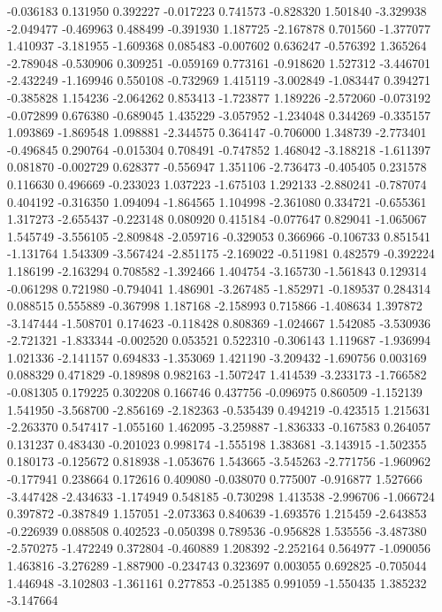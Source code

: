 -0.036183
0.131950
0.392227
-0.017223
0.741573
-0.828320
1.501840
-3.329938
-2.049477
-0.469963
0.488499
-0.391930
1.187725
-2.167878
0.701560
-1.377077
1.410937
-3.181955
-1.609368
0.085483
-0.007602
0.636247
-0.576392
1.365264
-2.789048
-0.530906
0.309251
-0.059169
0.773161
-0.918620
1.527312
-3.446701
-2.432249
-1.169946
0.550108
-0.732969
1.415119
-3.002849
-1.083447
0.394271
-0.385828
1.154236
-2.064262
0.853413
-1.723877
1.189226
-2.572060
-0.073192
-0.072899
0.676380
-0.689045
1.435229
-3.057952
-1.234048
0.344269
-0.335157
1.093869
-1.869548
1.098881
-2.344575
0.364147
-0.706000
1.348739
-2.773401
-0.496845
0.290764
-0.015304
0.708491
-0.747852
1.468042
-3.188218
-1.611397
0.081870
-0.002729
0.628377
-0.556947
1.351106
-2.736473
-0.405405
0.231578
0.116630
0.496669
-0.233023
1.037223
-1.675103
1.292133
-2.880241
-0.787074
0.404192
-0.316350
1.094094
-1.864565
1.104998
-2.361080
0.334721
-0.655361
1.317273
-2.655437
-0.223148
0.080920
0.415184
-0.077647
0.829041
-1.065067
1.545749
-3.556105
-2.809848
-2.059716
-0.329053
0.366966
-0.106733
0.851541
-1.131764
1.543309
-3.567424
-2.851175
-2.169022
-0.511981
0.482579
-0.392224
1.186199
-2.163294
0.708582
-1.392466
1.404754
-3.165730
-1.561843
0.129314
-0.061298
0.721980
-0.794041
1.486901
-3.267485
-1.852971
-0.189537
0.284314
0.088515
0.555889
-0.367998
1.187168
-2.158993
0.715866
-1.408634
1.397872
-3.147444
-1.508701
0.174623
-0.118428
0.808369
-1.024667
1.542085
-3.530936
-2.721321
-1.833344
-0.002520
0.053521
0.522310
-0.306143
1.119687
-1.936994
1.021336
-2.141157
0.694833
-1.353069
1.421190
-3.209432
-1.690756
0.003169
0.088329
0.471829
-0.189898
0.982163
-1.507247
1.414539
-3.233173
-1.766582
-0.081305
0.179225
0.302208
0.166746
0.437756
-0.096975
0.860509
-1.152139
1.541950
-3.568700
-2.856169
-2.182363
-0.535439
0.494219
-0.423515
1.215631
-2.263370
0.547417
-1.055160
1.462095
-3.259887
-1.836333
-0.167583
0.264057
0.131237
0.483430
-0.201023
0.998174
-1.555198
1.383681
-3.143915
-1.502355
0.180173
-0.125672
0.818938
-1.053676
1.543665
-3.545263
-2.771756
-1.960962
-0.177941
0.238664
0.172616
0.409080
-0.038070
0.775007
-0.916877
1.527666
-3.447428
-2.434633
-1.174949
0.548185
-0.730298
1.413538
-2.996706
-1.066724
0.397872
-0.387849
1.157051
-2.073363
0.840639
-1.693576
1.215459
-2.643853
-0.226939
0.088508
0.402523
-0.050398
0.789536
-0.956828
1.535556
-3.487380
-2.570275
-1.472249
0.372804
-0.460889
1.208392
-2.252164
0.564977
-1.090056
1.463816
-3.276289
-1.887900
-0.234743
0.323697
0.003055
0.692825
-0.705044
1.446948
-3.102803
-1.361161
0.277853
-0.251385
0.991059
-1.550435
1.385232
-3.147664
